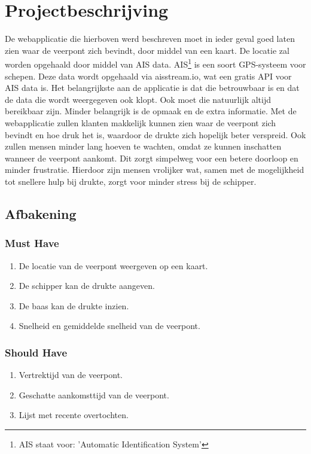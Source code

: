 \documentclass{article}
\begin{document}
\section{Projectbeschrijving}
De webapplicatie die hierboven werd beschreven moet in ieder geval goed laten zien waar de veerpont zich bevindt, door middel van een kaart. De locatie zal worden opgehaald door middel van AIS data. AIS\footnote[1]{AIS staat voor: 'Automatic Identification System'} is een soort GPS-systeem voor schepen. Deze data wordt opgehaald via aisstream.io, wat een gratis API voor AIS data is.
Het belangrijkste aan de applicatie is dat die betrouwbaar is en dat de data die wordt weergegeven ook klopt. Ook moet die natuurlijk altijd bereikbaar zijn. Minder belangrijk is de opmaak en de extra informatie. 
Met de webapplicatie zullen klanten makkelijk kunnen zien waar de veerpont zich bevindt en hoe druk het is, waardoor de drukte zich hopelijk beter verspreid. Ook zullen mensen minder lang hoeven te wachten, omdat ze kunnen inschatten wanneer de veerpont aankomt.
Dit zorgt simpelweg voor een betere doorloop en minder frustratie. Hierdoor zijn mensen vrolijker wat, samen met de mogelijkheid tot snellere hulp bij drukte, zorgt voor minder stress bij de schipper.


\subsection{Afbakening}
\subsubsection{Must Have}
\begin{enumerate}
    \item De locatie van de veerpont weergeven op een kaart.
    \item De schipper kan de drukte aangeven.
    \item De baas kan de drukte inzien.
    \item Snelheid en gemiddelde snelheid van de veerpont.
\end{enumerate}
\subsubsection{Should Have}
\begin{enumerate}
    \item Vertrektijd van de veerpont.
    \item Geschatte aankomsttijd van de veerpont.
    \item Lijst met recente overtochten.
\end{enumerate}
\end{document}
